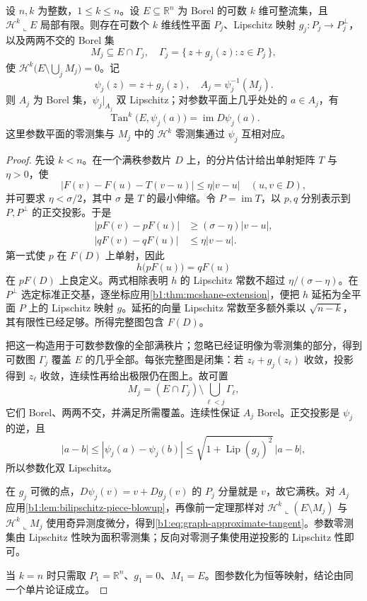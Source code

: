 \begin{proposition}\label{b1:prop:rectifiable-lipschitz-graphs}
设 \(n,k\) 为整数，\(1\leq k\leq n\)。设 \(E\subseteq\mathbb R^n\) 为 Borel 的可数 \(k\) 维可整流集，且 \(\mathcal H^k\llcorner E\) 局部有限。则存在可数个 \(k\) 维线性平面 \(P_j\)、Lipschitz 映射 \(g_j:P_j\rightarrow P_j^\perp\)，以及两两不交的 Borel 集
\[
 M_j\subseteq E\cap\Gamma_j,\quad
 \Gamma_j=\{\,z+g_j(z):z\in P_j\,\},
\]
使 \(\mathcal H^k\bigl(E\setminus\bigcup_jM_j\bigr)=0\)。记
\[
 \psi_j(z)=z+g_j(z),\quad A_j=\psi_j^{-1}(M_j).
\]
则 \(A_j\) 为 Borel 集，\(\psi_j|_{A_j}\) 双 Lipschitz；对参数平面上几乎处处的 \(a\in A_j\)，有
\begin{equation}\label{b1:eq:graph-approximate-tangent}
 \operatorname{Tan}^k\bigl(E,\psi_j(a)\bigr)
 =\operatorname{im}D\psi_j(a).
\end{equation}
这里参数平面的零测集与 \(M_j\) 中的 \(\mathcal H^k\) 零测集通过 \(\psi_j\) 互相对应。
\end{proposition}
\begin{proof}
先设 \(k<n\)。在一个满秩参数片 \(D\) 上，的分片估计给出单射矩阵 \(T\) 与 \(\eta>0\)，使
\[
 |F(v)-F(u)-T(v-u)|\leq\eta|v-u|
 \quad(u,v\in D),
\]
并可要求 \(\eta<\sigma/2\)，其中 \(\sigma\) 是 \(T\) 的最小伸缩。令 \(P=\operatorname{im}T\)，以 \(p,q\) 分别表示到 \(P,P^\perp\) 的正交投影。于是
\[
 \begin{aligned}
 |pF(v)-pF(u)|&\geq(\sigma-\eta)|v-u|,\\
 |qF(v)-qF(u)|&\leq\eta|v-u|.
 \end{aligned}
\]
第一式使 \(p\) 在 \(F(D)\) 上单射，因此
\[
 h\bigl(pF(u)\bigr)=qF(u)
\]
在 \(pF(D)\) 上良定义。两式相除表明 \(h\) 的 Lipschitz 常数不超过 \(\eta/(\sigma-\eta)\)。在 \(P^\perp\) 选定标准正交基，逐坐标应用\cref{b1:thm:mcshane-extension}，便把 \(h\) 延拓为全平面 \(P\) 上的 Lipschitz 映射 \(g\)。延拓的向量 Lipschitz 常数至多额外乘以 \(\sqrt{n-k}\)，其有限性已经足够。所得完整图包含 \(F(D)\)。

把这一构造用于可数参数像的全部满秩片；忽略已经证明像为零测集的部分，得到可数图 \(\Gamma_j\) 覆盖 \(E\) 的几乎全部。每张完整图是闭集：若 \(z_\ell+g_j(z_\ell)\) 收敛，投影得到 \(z_\ell\) 收敛，连续性再给出极限仍在图上。故可置
\[
 M_j=(E\cap\Gamma_j)\setminus\bigcup_{\ell<j}\Gamma_\ell,
\]
它们 Borel、两两不交，并满足所需覆盖。连续性保证 \(A_j\) Borel。正交投影是 \(\psi_j\) 的逆，且
\[
 |a-b|\leq|\psi_j(a)-\psi_j(b)|
 \leq\sqrt{1+\operatorname{Lip}(g_j)^2}\,|a-b|,
\]
所以参数化双 Lipschitz。

在 \(g_j\) 可微的点，\(D\psi_j(v)=v+Dg_j(v)\) 的 \(P_j\) 分量就是 \(v\)，故它满秩。对 \(A_j\) 应用\cref{b1:lem:bilipschitz-piece-blowup}，再像前一定理那样对 \(\mathcal H^k\llcorner(E\setminus M_j)\) 与 \(\mathcal H^k\llcorner M_j\) 使用奇异测度微分，得到\eqref{b1:eq:graph-approximate-tangent}。参数零测集由 Lipschitz 性映为面积零测集；反向对零测子集使用逆投影的 Lipschitz 性即可。

当 \(k=n\) 时只需取 \(P_1=\mathbb R^n\)、\(g_1=0\)、\(M_1=E\)。图参数化为恒等映射，结论由同一个单片论证成立。
\end{proof}

